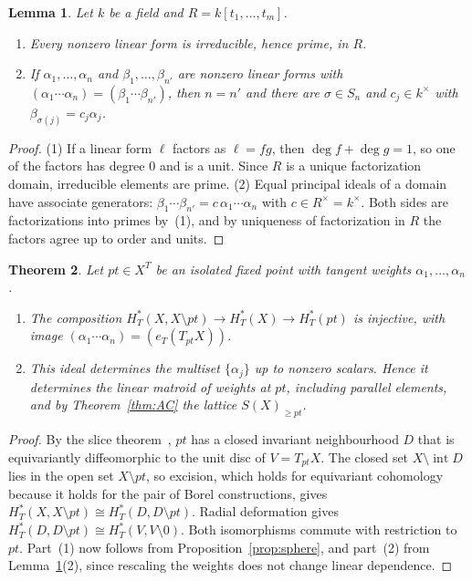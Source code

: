 \documentclass[11pt,a4paper]{article}
\numberwithin{equation}{section}
\theoremstyle{plain}
\newtheorem{theorem}{Theorem}[section]
\newtheorem{lemma}[theorem]{Lemma}
\theoremstyle{definition}
\theoremstyle{remark}
\newcommand{\HT}{H^{*}_{T}}
\begin{document}
\begin{lemma}\label{lem:ufd}
Let $k$ be a field and $R=k[t_1,\dots,t_m]$.
\begin{enumerate}[nosep,label=(\arabic*)]
\item Every nonzero linear form is irreducible, hence prime, in $R$.
\item If $\alpha_1,\dots,\alpha_n$ and $\beta_1,\dots,\beta_{n'}$ are nonzero linear forms with $(\alpha_1\cdots\alpha_n)=(\beta_1\cdots\beta_{n'})$, then $n=n'$ and there are $\sigma\in S_n$ and $c_j\in k^\times$ with $\beta_{\sigma(j)}=c_j\alpha_j$.
\end{enumerate}
\end{lemma}

\begin{proof}
(1) If a linear form $\ell$ factors as $\ell=fg$, then $\deg f+\deg g=1$, so one of the factors has degree $0$ and is a unit. Since $R$ is a unique factorization domain, irreducible elements are prime. (2) Equal principal ideals of a domain have associate generators: $\beta_1\cdots\beta_{n'}=c\,\alpha_1\cdots\alpha_n$ with $c\in R^\times=k^\times$. Both sides are factorizations into primes by~(1), and by uniqueness of factorization in $R$ the factors agree up to order and units.
\end{proof}

\begin{theorem}\label{thm:main}
Let $pt\in X^T$ be an isolated fixed point with tangent weights $\alpha_1,\dots,\alpha_n$.
\begin{enumerate}[nosep,label=(\arabic*)]
\item The composition $\HT(X,X\setminus pt)\to\HT(X)\to\HT(pt)$ is injective, with image $(\alpha_1\cdots\alpha_n)=(e_T(T_{pt}X))$.
\item This ideal determines the multiset $\{\alpha_j\}$ up to nonzero scalars. Hence it determines the linear matroid of weights at $pt$, including parallel elements, and by Theorem~\ref{thm:AC} the lattice $S(X)_{\geqslant pt}$.
\end{enumerate}
\end{theorem}

\begin{proof}
By the slice theorem~\cite{Bre72}, $pt$ has a closed invariant neighbourhood $D$ that is equivariantly diffeomorphic to the unit disc of $V=T_{pt}X$. The closed set $X\setminus\operatorname{int}D$ lies in the open set $X\setminus pt$, so excision, which holds for equivariant cohomology because it holds for the pair of Borel constructions, gives $\HT(X,X\setminus pt)\cong\HT(D,D\setminus pt)$. Radial deformation gives $\HT(D,D\setminus pt)\cong\HT(V,V\setminus0)$. Both isomorphisms commute with restriction to $pt$. Part~(1) now follows from Proposition~\ref{prop:sphere}, and part~(2) from Lemma~\ref{lem:ufd}(2), since rescaling the weights does not change linear dependence.
\end{proof}
\end{document}
